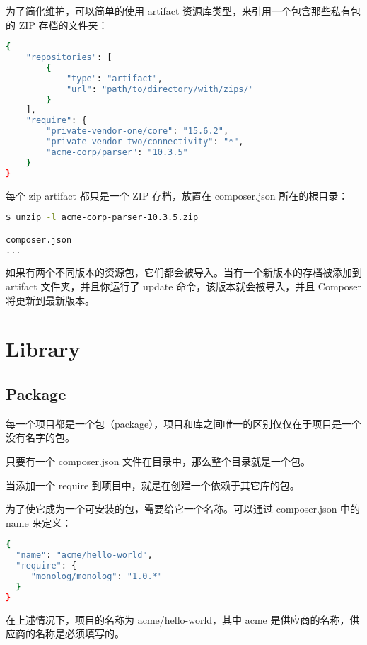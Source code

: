为了简化维护，可以简单的使用 artifact 资源库类型，来引用一个包含那些私有包的 ZIP 存档的文件夹：

\begin{lstlisting}[language=bash]
{
    "repositories": [
        {
            "type": "artifact",
            "url": "path/to/directory/with/zips/"
        }
    ],
    "require": {
        "private-vendor-one/core": "15.6.2",
        "private-vendor-two/connectivity": "*",
        "acme-corp/parser": "10.3.5"
    }
}
\end{lstlisting}

每个 zip artifact 都只是一个 ZIP 存档，放置在 composer.json 所在的根目录：


\begin{lstlisting}[language=bash]
$ unzip -l acme-corp-parser-10.3.5.zip

composer.json
...
\end{lstlisting}

如果有两个不同版本的资源包，它们都会被导入。当有一个新版本的存档被添加到 artifact 文件夹，并且你运行了 update 命令，该版本就会被导入，并且 Composer 将更新到最新版本。






\section{Library}


\subsection{Package}


每一个项目都是一个包（package），项目和库之间唯一的区别仅仅在于项目是一个没有名字的包。



只要有一个 composer.json 文件在目录中，那么整个目录就是一个包。

当添加一个 require 到项目中，就是在创建一个依赖于其它库的包。


为了使它成为一个可安装的包，需要给它一个名称。可以通过 composer.json 中的 name 来定义：



\begin{lstlisting}[language=bash]
{
  "name": "acme/hello-world",
  "require": {
     "monolog/monolog": "1.0.*"
  }
}
\end{lstlisting}


在上述情况下，项目的名称为 acme/hello-world，其中 acme 是供应商的名称，供应商的名称是必须填写的。


